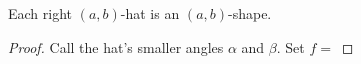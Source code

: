 \documentclass[%
    a4paper,              %
    style=print,          %
    bibliography=totoc,   %
    nexus,                %
    lnum,                 %
    extramargin,          %
]{tubsbook}
\begin{document}
\begin{theorem}\label{th:circlesinhat}
    Each right $(a,b)$-hat is an $(a,b)$-shape.
\end{theorem}

\begin{proof}
    Call the hat's smaller angles $\alpha$ and $\beta$. Set $f = $
\end{proof}
%
%
%
%
%
%
%
\end{document}
